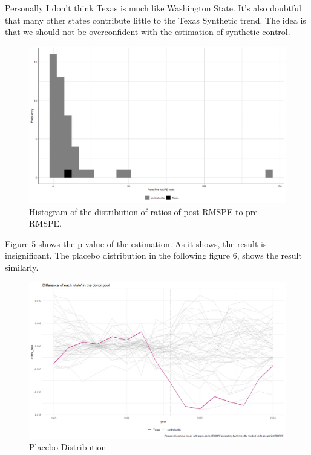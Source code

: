 \documentclass{article}
\begin{document}
Personally I don't think Texas is much like Washington State. It's also doubtful that many other states contribute little to the Texas Synthetic trend. The idea is that we should not be overconfident with the estimation of synthetic control.


\begin{figure}[H]
    \begin{center}
        \includegraphics[width=.85\textwidth]{Figures/figure_5.png}
    \end{center}
    \caption{Histogram of the distribution of ratios of post-RMSPE to pre-RMSPE.}
    \label{fig:graph}
\end{figure}


Figure 5 shows the p-value of the estimation. As it shows, the result is insignificant. The placebo distribution in the following figure 6, shows the result similarly. 


\begin{figure}[H]
    \begin{center}
        \includegraphics[width=.85\textwidth]{Figures/figure_6.png}
    \end{center}
    \caption{Placebo Distribution}
    \label{fig:graph}
\end{figure}
\end{document}
